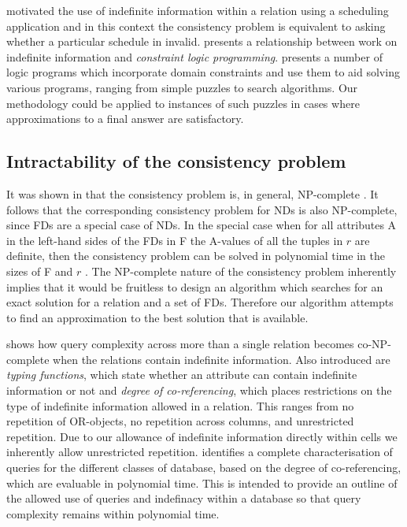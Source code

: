 \cite{inv91} motivated the use of indefinite information within a 
relation using a scheduling application and in this context the consistency problem is equivalent to
asking whether a particular schedule in invalid. \cite{vn95} presents
a relationship between work on indefinite information and {\em constraint
logic programming}. \cite{vhe89} presents a number of logic programs
which incorporate domain constraints and use them to aid solving
various programs, ranging from simple puzzles to search
algorithms. Our methodology could be applied to instances of such
puzzles in cases where approximations to a final answer are satisfactory.

\subsection{Intractability of the consistency problem}
It was shown in \cite{vn95} that the consistency problem is,
in general, NP-complete \cite{gj79}.  It follows that the 
corresponding consistency problem for NDs is also
NP-complete, since FDs are a special case of NDs.
In the special case when for all attributes A in the left-hand sides 
of the FDs in F the A-values of all the tuples in $r$ are definite,
then the consistency problem can be solved in polynomial time
in the sizes of F and $r$ \cite{vn95}.
The NP-complete nature of the consistency problem inherently
implies that it would be fruitless to design an algorithm which
searches for an exact solution for a relation and a set of FDs. Therefore
our algorithm attempts to find an approximation to the best
solution that is available.

\cite{ivv95} shows how query complexity across more
than a single relation becomes
co-NP-complete when the relations contain indefinite information. Also 
introduced are {\em typing functions}, which state whether an
attribute can contain indefinite information or not and {\em degree of 
co-referencing}, which places restrictions on
the type of indefinite information allowed in a relation. This ranges
from no repetition of OR-objects, no repetition across columns, and
unrestricted repetition. Due to our allowance of indefinite
information directly within cells we inherently allow unrestricted
repetition. \cite{ivv95} identifies a complete characterisation of
queries for the different classes of database, based on the degree of
co-referencing, which are evaluable in polynomial time. This is
intended to provide an outline of the allowed use of queries and
indefinacy within a database so that query complexity remains
within polynomial time.


